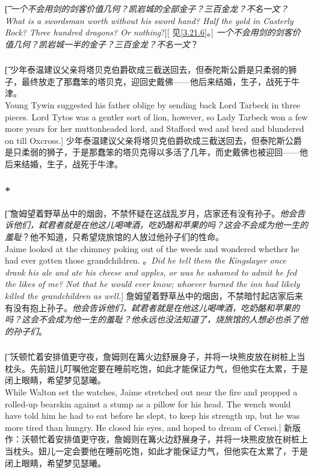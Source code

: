 \documentclass[12pt,a4paper]{article}
\begin{document}
\subsubsection{}\t[
	\emph{一个不会用剑的剑客价值几何？凯岩城的全部金子？三百金龙？不名一文？\\
	What is a swordsman worth without his sword hand? Half the gold in Casterly Rock? Three hundred dragons? Or nothing}?][
	见\ref{3.21.6}。]
	\emph{一个不会用剑的剑客价值几何？凯岩城一半的金子？三百金龙？不名一文}？
	
\subsubsection{}\t[
	少年泰温建议父亲将塔贝克伯爵砍成三截送回去，但泰陀斯公爵是只柔弱的狮子，最终放走了那蠢笨的塔贝克，迎回史戴佛——他后来结婚，生子，战死于牛津。\\
	Young Tywin suggested his father oblige by sending back Lord Tarbeck in three pieces. Lord Tytos was a gentler sort of lion, however, so Lady Tarbeck won a few more years for her muttonheaded lord, and Stafford wed and bred and blundered on till Oxcross.]
	少年泰温建议父亲将塔贝克伯爵砍成三截送回去，但泰陀斯公爵是只柔弱的狮子，于是那蠢笨的塔贝克得以多活了几年，而史戴佛也被迎回——他后来结婚，生子，战死于牛津。
	
\subsubsection{\color{red}*}\t[
詹姆望着野草丛中的烟囱，不禁怀疑在这战乱岁月，店家还有没有孙子。\emph{他会告诉他们，弑君者就是在他这儿喝啤酒，吃奶酪和苹果的吗？这会不会成为他一生的羞耻}？他不知道，只希望烧旅馆的人放过他孙子们的性命。\\
Jaime looked at the chimney poking out of the weeds and wondered whether he had ever gotten those grandchildren. 。\emph{Did he tell them the Kingslayer once drank his ale and ate his cheese and apples, or was he ashamed to admit he fed the likes of me? Not that he would ever know; whoever burned the inn had likely killed the grandchildren as well.}]
詹姆望着野草丛中的烟囱，不禁暗忖起店家后来有没有抱上孙子。\emph{他会告诉他们，弑君者就是在他这儿喝啤酒，吃奶酪和苹果的吗？这会不会成为他一生的羞耻？他永远也没法知道了，烧旅馆的人想必也杀了他的孙子们}。

\subsubsection{}\t[
	沃顿忙着安排值更守夜，詹姆则在篝火边舒展身子，并将一块熊皮放在树桩上当枕头。先前妞儿叮嘱他定要在睡前吃饱，如此才能保证力气，但他实在太累，于是闭上眼睛，希望梦见瑟曦。\\
	While Walton set the watches, Jaime stretched out near the fire and propped a rolled-up bearskin against a stump as a pillow for his head. The wench would have told him he had to eat before he slept, to keep his strength up, but he was more tired than hungry. He closed his eyes, and hoped to dream of Cersei.]
	新版作：沃顿忙着安排值更守夜，詹姆则在篝火边舒展身子，并将一块熊皮放在树桩上当枕头。妞儿一定会要他在睡前吃饱，如此才能保证力气，但他实在太累了，于是闭上眼睛，希望梦见瑟曦。
	
\end{document}
